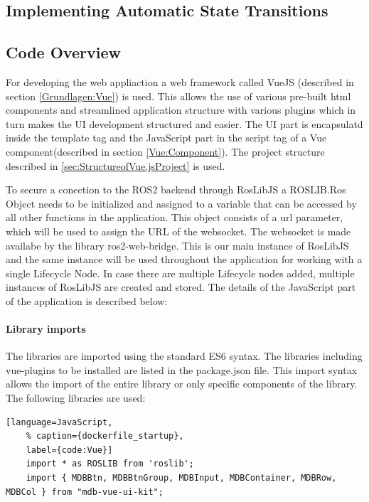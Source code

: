\subsection{Implementing Automatic State Transitions}

\subsection{Code Overview} For developing the web appliaction a web framework called VueJS (described in section \ref{Grundlagen:Vue}) is used. This allows the use of various pre-built html components and streamlined application structure with various plugins which in turn makes the UI development structured and easier. The UI part is encapsulatd inside the template tag and the JavaScript part in the script tag of a Vue component(described in section \ref{Vue:Component}). The project structure described in \ref{sec:StructureofVue.jsProject} is used.   

To secure a conection to the ROS2 backend through RosLibJS a ROSLIB.Ros Object needs to be initialized and assigned to a variable that can be accessed by all other functions in the application. This object consists of a url parameter, which will be used to assign the URL of the websocket. The websocket is made availabe by the library ros2-web-bridge. This is our main instance of RosLibJS and the same instance will be used throughout the application for working with a single Lifecycle Node. In case there are multiple Lifecycle nodes added, multiple instances of RosLibJS are created and stored. The details of the JavaScript part of the application is described below:

\paragraph{Library imports} The libraries are imported using the standard ES6 syntax. The libraries including vue-plugins to be installed are listed in the package.json file. This import syntax allows the import of the entire library or only specific components of the library. The following libraries are used:

\begin{lstlisting}[language=JavaScript,
	% caption={dockerfile_startup}, 
	label={code:Vue}]
	import * as ROSLIB from 'roslib';
	import { MDBBtn, MDBBtnGroup, MDBInput, MDBContainer, MDBRow, MDBCol } from "mdb-vue-ui-kit";
\end{lstlisting}


